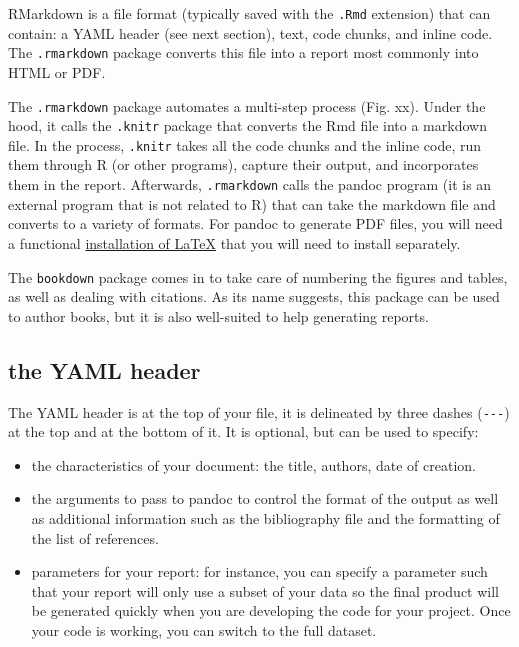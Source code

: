 \documentclass[
]{book}
\providecommand{\tightlist}{%
  \setlength{\itemsep}{0pt}\setlength{\parskip}{0pt}}
\theoremstyle{definition}
\theoremstyle{definition}
\theoremstyle{definition}
\theoremstyle{definition}
\theoremstyle{remark}
\begin{document}
RMarkdown is a file format (typically saved with the \texttt{.Rmd} extension) that can contain: a YAML header (see next section), text, code chunks, and inline code. The \texttt{.rmarkdown} package converts this file into a report most commonly into HTML or PDF.

The \texttt{.rmarkdown} package automates a multi-step process (Fig. xx). Under the hood, it calls the \texttt{.knitr} package that converts the Rmd file into a markdown file. In the process, \texttt{.knitr} takes all the code chunks and the inline code, run them through R (or other programs), capture their output, and incorporates them in the report. Afterwards, \texttt{.rmarkdown} calls the pandoc program (it is an external program that is not related to R) that can take the markdown file and converts to a variety of formats. For pandoc to generate PDF files, you will need a functional \href{https://www.latex-project.org/get/}{installation of LaTeX} that you will need to install separately.

The \texttt{bookdown} package comes in to take care of numbering the figures and tables, as well as dealing with citations. As its name suggests, this package can be used to author books, but it is also well-suited to help generating reports.

\hypertarget{the-yaml-header}{%
\subsection{the YAML header}\label{the-yaml-header}}

The YAML header is at the top of your file, it is delineated by three dashes (\texttt{-\/-\/-}) at the top and at the bottom of it. It is optional, but can be used to specify:

\begin{itemize}
\tightlist
\item
  the characteristics of your document: the title, authors, date of creation.
\item
  the arguments to pass to pandoc to control the format of the output as
  well as additional information such as the bibliography file and the
  formatting of the list of references.
\item
  parameters for your report: for instance, you can specify a parameter such that your report will only use a subset of your data so the final product will be generated quickly when you are developing the code for your project. Once your code is working, you can switch to the full dataset.
\end{itemize}
\end{document}
